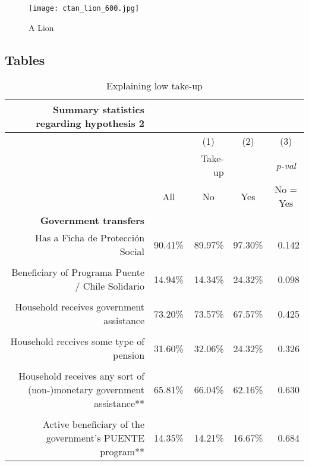 \documentclass{article}
\begin{document}
\begin{center}
	\begin{figure}[h]
		\caption{A Lion}
		\texttt{[image: ctan\_lion\_600.jpg]}
	\end{figure}
\end{center}

\begin{landscape}
\section{Tables}

{\small{
\begin{table}[]
  \centering
  \caption{Explaining low take-up}
    \begin{tabular}{rrrrr}
    \toprule
    \textbf{Summary statistics regarding hypothesis 2} &       &       &       &  \\
    \midrule
          &       & \multicolumn{1}{c}{(1)} & \multicolumn{1}{c}{(2)} & \multicolumn{1}{c}{(3)} \\
          &       & Take-up &       & \multicolumn{1}{c}{\textit{p-val}} \\
          & \multicolumn{1}{c}{All} & \multicolumn{1}{c}{No} & \multicolumn{1}{c}{Yes} & \multicolumn{1}{c}{No = Yes} \\
    \textbf{Government transfers} &       &       &       &  \\
    Has a Ficha de Protecci\'{o}n Social & 90.41\% & 89.97\% & 97.30\% & 0.142 \\
          &       &       &       &  \\
    Beneficiary of Programa Puente / Chile Solidario & 14.94\% & 14.34\% & 24.32\% & 0.098 \\
          &       &       &       &  \\
    Household receives government assistance & 73.20\% & 73.57\% & 67.57\% & 0.425 \\
          &       &       &       &  \\
    Household receives some type of pension & 31.60\% & 32.06\% & 24.32\% & 0.326 \\
          &       &       &       &  \\
    Household receives any sort of (non-)monetary government assistance** & 65.81\% & 66.04\% & 62.16\% & 0.630 \\
          &       &       &       &  \\
    Active beneficiary of the government's PUENTE program** & 14.35\% & 14.21\% & 16.67\% & 0.684 \\
    \bottomrule
    \end{tabular}%
  \label{tab:addlabel}%
\end{table}%
}} %
\end{landscape}%
\end{document}
